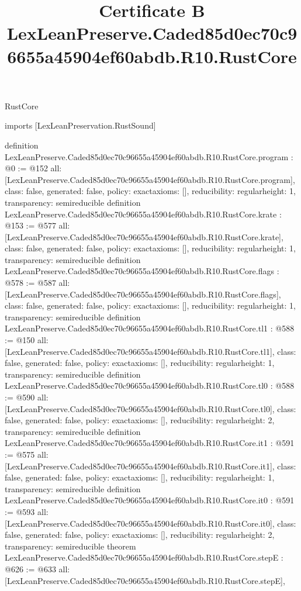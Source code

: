 \begin{lexlean}{RustCore}
\title{Certificate B LexLeanPreserve.Caded85d0ec70c96655a45904ef60abdb.R10.RustCore}
\begin{coremodule}
imports [LexLeanPreservation.RustSound]

definition LexLeanPreserve.Caded85d0ec70c96655a45904ef60abdb.R10.RustCore.program : @0 := @152 {
  all: [LexLeanPreserve.Caded85d0ec70c96655a45904ef60abdb.R10.RustCore.program],
  class: false,
  generated: false,
  policy: exact{axioms: []},
  reducibility: regular{height: 1},
  transparency: semireducible
}
definition LexLeanPreserve.Caded85d0ec70c96655a45904ef60abdb.R10.RustCore.krate : @153 := @577 {
  all: [LexLeanPreserve.Caded85d0ec70c96655a45904ef60abdb.R10.RustCore.krate],
  class: false,
  generated: false,
  policy: exact{axioms: []},
  reducibility: regular{height: 1},
  transparency: semireducible
}
definition LexLeanPreserve.Caded85d0ec70c96655a45904ef60abdb.R10.RustCore.flags : @578 := @587 {
  all: [LexLeanPreserve.Caded85d0ec70c96655a45904ef60abdb.R10.RustCore.flags],
  class: false,
  generated: false,
  policy: exact{axioms: []},
  reducibility: regular{height: 1},
  transparency: semireducible
}
definition LexLeanPreserve.Caded85d0ec70c96655a45904ef60abdb.R10.RustCore.tl1 : @588 := @150 {
  all: [LexLeanPreserve.Caded85d0ec70c96655a45904ef60abdb.R10.RustCore.tl1],
  class: false,
  generated: false,
  policy: exact{axioms: []},
  reducibility: regular{height: 1},
  transparency: semireducible
}
definition LexLeanPreserve.Caded85d0ec70c96655a45904ef60abdb.R10.RustCore.tl0 : @588 := @590 {
  all: [LexLeanPreserve.Caded85d0ec70c96655a45904ef60abdb.R10.RustCore.tl0],
  class: false,
  generated: false,
  policy: exact{axioms: []},
  reducibility: regular{height: 2},
  transparency: semireducible
}
definition LexLeanPreserve.Caded85d0ec70c96655a45904ef60abdb.R10.RustCore.it1 : @591 := @575 {
  all: [LexLeanPreserve.Caded85d0ec70c96655a45904ef60abdb.R10.RustCore.it1],
  class: false,
  generated: false,
  policy: exact{axioms: []},
  reducibility: regular{height: 1},
  transparency: semireducible
}
definition LexLeanPreserve.Caded85d0ec70c96655a45904ef60abdb.R10.RustCore.it0 : @591 := @593 {
  all: [LexLeanPreserve.Caded85d0ec70c96655a45904ef60abdb.R10.RustCore.it0],
  class: false,
  generated: false,
  policy: exact{axioms: []},
  reducibility: regular{height: 2},
  transparency: semireducible
}
theorem LexLeanPreserve.Caded85d0ec70c96655a45904ef60abdb.R10.RustCore.stepE : @626 := @633 {
  all: [LexLeanPreserve.Caded85d0ec70c96655a45904ef60abdb.R10.RustCore.stepE],
}
\end{coremodule}
\end{lexlean}

